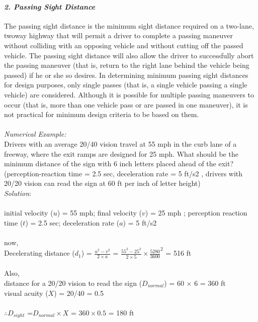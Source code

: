 \paragraph{\emph{2. Passing Sight Distance}}
The passing sight distance is the minimum sight distance required on a two-lane, twoway highway that will permit a driver to complete a passing maneuver without colliding with an opposing vehicle and without cutting off the passed vehicle. The passing sight distance will also allow the driver to successfully abort the passing maneuver (that is, return to the right lane behind the vehicle being passed) if he or she so desires. In determining minimum passing sight distances for design purposes, only single passes (that is, a single vehicle passing a single vehicle) are considered. Although it is possible for multiple passing maneuvers to occur (that is, more than one vehicle pass or are passed in one maneuver), it is not practical for minimum design criteria to be based on them.\\\\
\emph{Numerical Example:}\\
Drivers with an average 20/40 vision travel at 55 mph in the curb lane of a freeway, where the exit ramps are designed for 25 mph. What should be the minimum distance of the sign with 6 inch letters placed ahead of the exit? (perception-reaction time = 2.5 sec, deceleration rate = 5 ft/s2 , drivers with 20/20 vision can read the sign at 60 ft per inch of letter height)\\
\emph{Solution}:\\\\
initial velocity ($ u $) = 55 mph; final velocity ($ v $) = 25 mph ; perception reaction time ($ t $) = 2.5 sec; 	deceleration rate ($ a $) = 5 ft/s2 \\\\
now,\\
Decelerating distance ($ d_1 $) = $ \frac{u^2 - v^2}{2 \times a} $ = $ \frac{55^2 - 25^2}{2 \times 5} \times \frac{5280}{3600}^2 $ = 516 ft\\\\
Also,\\
distance for a 20/20 vision to read the sign ($ D_{normal} $) = 60 $ \times $ 6 = 360 ft\\
visual acuity ($ X $) = 20/40 = 0.5\\\\
$ \therefore D_{sight} $ =$ D_{normal} \times X $ = $ 360 \times 0.5 $ = 180 ft\\\\
